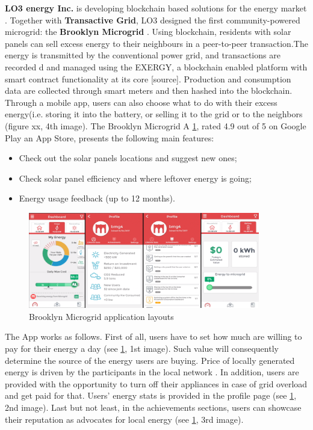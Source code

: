 \textbf{LO3 energy Inc.} is developing blockchain based solutions for the energy market \cite{lo3energy}. Together with \textbf{Transactive Grid}, LO3 designed the first community-powered microgrid: the \textbf{Brooklyn Microgrid} \cite{lo3energy}. Using blockchain, residents with solar panels can sell excess energy to their neighbours in a peer-to-peer transaction.The energy is transmitted by the conventional power grid, and transactions are recorded d and managed using the EXERGY, a blockchain enabled platform with smart contract functionality at its core [source]. Production and consumption data are collected through smart meters and then hashed into the blockchain. Through a mobile app, users can also choose what to do with their excess energy(i.e. storing it into the battery, or selling it to the grid or to the neighbors (figure xx, 4th image).  The Brooklyn Microgrid A \cref{fig:microgrid}, rated 4.9 out of 5 on Google Play an App Store, presents the following main features:

\begin{itemize}
    \item Check out the solar panels locations and suggest new ones;
    \item Check solar panel efficiency and where leftover energy is going;
    \item Energy usage feedback (up to 12 months).
\end{itemize}

\begin{figure}[h]
\centering
\includegraphics[width=0.9\textwidth]{./Images/microgrid}
\caption{Brooklyn Microgrid application layouts}
\label{fig:microgrid}
\end{figure}

The App works as follows. First of all, users have to set how much are willing to pay for their energy a day (see \cref{fig:microgrid}, 1st image). Such value will consequently determine the source of the energy users are buying. Price of locally generated energy is driven by the participants in the local network \cite{vimeo}. In addition, users are provided with the opportunity to turn off their appliances in case of grid overload and get paid for that. Users’ energy stats is provided in the profile page (see \cref{fig:microgrid}, 2nd image). Last but not least, in the achievements sections, users can showcase their reputation as advocates for local energy (see \cref{fig:microgrid}, 3rd image).



